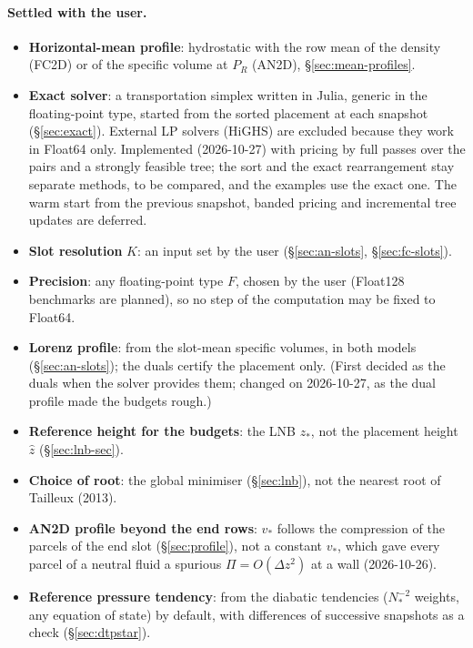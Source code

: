 \documentclass[11pt,a4paper]{article}
\newcommand{\zs}{z_{*}}
\newcommand{\zh}{\hat z}
\begin{document}
\paragraph{Settled with the user.}
\begin{itemize}
  \item \textbf{Horizontal-mean profile}: hydrostatic with the row mean of the density (FC2D) or of the specific volume at
        $P_R$ (AN2D), \S\ref{sec:mean-profiles}.
  \item \textbf{Exact solver}: a transportation simplex written in Julia, generic in the floating-point type, started from
        the sorted placement at each snapshot (\S\ref{sec:exact}). External LP solvers (HiGHS) are excluded because they work
        in Float64 only. Implemented (2026-10-27) with pricing by full passes over the pairs and a strongly feasible tree; the
        sort and the exact rearrangement stay separate methods, to be compared, and the examples use the exact one. The
        warm start from the previous snapshot, banded pricing and incremental tree updates are deferred.
  \item \textbf{Slot resolution} $K$: an input set by the user (\S\ref{sec:an-slots}, \S\ref{sec:fc-slots}).
  \item \textbf{Precision}: any floating-point type $F$, chosen by the user (Float128 benchmarks are planned), so no step of
        the computation may be fixed to Float64.
  \item \textbf{Lorenz profile}: from the slot-mean specific volumes, in both models (\S\ref{sec:an-slots}); the duals
        certify the placement only. (First decided as the duals when the solver provides them; changed on 2026-10-27, as the
        dual profile made the budgets rough.)
  \item \textbf{Reference height for the budgets}: the LNB $\zs$, not the placement height $\zh$ (\S\ref{sec:lnb-sec}).
  \item \textbf{Choice of root}: the global minimiser (\S\ref{sec:lnb}), not the nearest root of Tailleux (2013).
  \item \textbf{AN2D profile beyond the end rows}: $v_*$ follows the compression of the parcels of the end slot
        (\S\ref{sec:profile}), not a constant $v_*$, which gave every parcel of a neutral fluid a spurious
        $\Pi=O(\Delta z^2)$ at a wall (2026-10-26).
  \item \textbf{Reference pressure tendency}: from the diabatic tendencies ($N_*^{-2}$ weights, any equation of state) by
        default, with differences of successive snapshots as a check (\S\ref{sec:dtpstar}).

\end{itemize}
\end{document}
